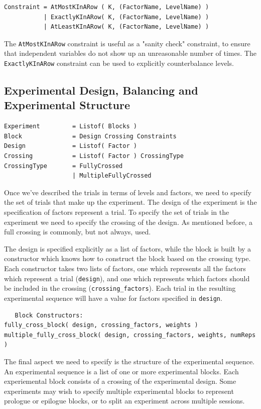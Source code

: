\begin{verbatim}
Constraint = AtMostKInARow ( K, (FactorName, LevelName) )
           | ExactlyKInARow( K, (FactorName, LevelName) )
           | AtLeastKInARow( K, (FactorName, LevelName) )
\end{verbatim}

The \texttt{AtMostKInARow} constraint is useful as a "sanity check" constraint, to ensure that independent variables do not show up an unreasonable number of times. The \texttt{ExactlyKInARow} constraint can be used to explicitly counterbalance levels.

\subsection{Experimental Design, Balancing and Experimental Structure}

\begin{verbatim}
Experiment         = Listof( Blocks )
Block              = Design Crossing Constraints
Design             = Listof( Factor )
Crossing           = Listof( Factor ) CrossingType
CrossingType       = FullyCrossed
                   | MultipleFullyCrossed
\end{verbatim}


Once we've described the trials in terms of levels and factors, we need to specify the set of trials that make up the experiment. The design of the experiment is the specification of factors represent a trial. To specify the set of trials in the experiment we need to specify the crossing of the design. As mentioned before, a full crossing is commonly, but not always, used.

The design is specified explicitly as a list of factors, while the block is built by a constructor which knows how to construct the block based on the crossing type. Each constructor takes two lists of factors, one which represents all the factors which represent a trial (\texttt{design}), and one which represents which factors should be included in the crossing (\texttt{crossing\_factors}). Each trial in the resulting experimental sequence will have a value for factors specified in \texttt{design}.

\begin{verbatim}
   Block Constructors:
fully_cross_block( design, crossing_factors, weights )
multiple_fully_cross_block( design, crossing_factors, weights, numReps )
\end{verbatim}

The final aspect we need to specify is the structure of the experimental sequence. An experimental sequence is a list of one or more experimental blocks. Each experiemental block consists of a crossing of the experimental design. Some experiments may wish to specify multiple experimental blocks to represent prologue or epilogue blocks, or to split an experiment across multiple sessions.

